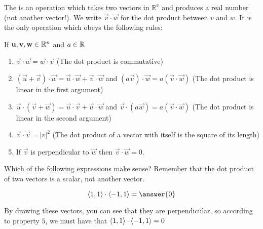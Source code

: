 \documentclass{ximera}
\begin{document}
\begin{definition}
	The  is an operation which takes two vectors in $\mathbb{R^n}$ and produces a real number (not another vector!).   We write $\vec{v} \cdot \vec{w}$ for the dot product between $v$ and $w$. It is the only operation which obeys the following rules:
	
	If $\mathbf{u},\mathbf{v},\mathbf{w} \in \mathbb R^n$ and $a \in \mathbb R$
	
\begin{enumerate}
\item $\vec{v} \cdot \vec{w} = \vec{w} \cdot \vec{v}$ (The dot product is commutative)
			
\item $(\vec{u}+\vec{v})\cdot \vec{w} = \vec{u}\cdot \vec{w} + \vec{v}\cdot \vec{w}$ 	and $(a\vec{v})\cdot \vec{w} = a(\vec{v} \cdot \vec{w})$ (The dot product is linear in the first argument)
			
\item $\vec{u} \cdot (\vec{v}+\vec{w}) = \vec{u}\cdot \vec{v}+ \vec{u}\cdot \vec{w}$ and  $\vec{v} \cdot (a\vec{w}) = a(\vec{v} \cdot  \vec{w})$ (The dot product is linear in the second argument)
			
\item $\vec{v} \cdot \vec{v} = |v|^2$ (The dot product of a vector with itself is the square of its length)
			
\item If  $\vec{v}$ is perpendicular to $\vec{w}$ then $\vec{v} \cdot \vec{w} = 0$.  
\end{enumerate}

\end{definition}

\begin{question}
	Which of the following expressions make sense?  Remember that the dot product of two vectors is a scalar, not another vector.
	
	\begin{selectAll}
	\end{selectAll}
\end{question}

\begin{question}
	\[
	 \vector{1,1} \cdot \vector{-1,1} = \answer{0}
	\]
		\begin{hint}
			By drawing these vectors, you can see that they are perpendicular, so according to property $5$, we must have that $\left\langle 1,1\right\rangle \cdot \left\langle -1,1\right\rangle = 0$
		\end{hint}
\end{question}
\end{document}
